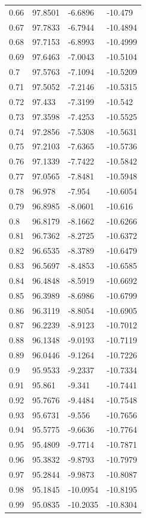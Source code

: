 \begin{tabular}{llll}
0.66 & 97.8501 & -6.6896 & -10.479 \\
0.67 & 97.7833 & -6.7944 & -10.4894 \\
0.68 & 97.7153 & -6.8993 & -10.4999 \\
0.69 & 97.6463 & -7.0043 & -10.5104 \\
0.7 & 97.5763 & -7.1094 & -10.5209 \\
0.71 & 97.5052 & -7.2146 & -10.5315 \\
0.72 & 97.433 & -7.3199 & -10.542 \\
0.73 & 97.3598 & -7.4253 & -10.5525 \\
0.74 & 97.2856 & -7.5308 & -10.5631 \\
0.75 & 97.2103 & -7.6365 & -10.5736 \\
0.76 & 97.1339 & -7.7422 & -10.5842 \\
0.77 & 97.0565 & -7.8481 & -10.5948 \\
0.78 & 96.978 & -7.954 & -10.6054 \\
0.79 & 96.8985 & -8.0601 & -10.616 \\
0.8 & 96.8179 & -8.1662 & -10.6266 \\
0.81 & 96.7362 & -8.2725 & -10.6372 \\
0.82 & 96.6535 & -8.3789 & -10.6479 \\
0.83 & 96.5697 & -8.4853 & -10.6585 \\
0.84 & 96.4848 & -8.5919 & -10.6692 \\
0.85 & 96.3989 & -8.6986 & -10.6799 \\
0.86 & 96.3119 & -8.8054 & -10.6905 \\
0.87 & 96.2239 & -8.9123 & -10.7012 \\
0.88 & 96.1348 & -9.0193 & -10.7119 \\
0.89 & 96.0446 & -9.1264 & -10.7226 \\
0.9 & 95.9533 & -9.2337 & -10.7334 \\
0.91 & 95.861 & -9.341 & -10.7441 \\
0.92 & 95.7676 & -9.4484 & -10.7548 \\
0.93 & 95.6731 & -9.556 & -10.7656 \\
0.94 & 95.5775 & -9.6636 & -10.7764 \\
0.95 & 95.4809 & -9.7714 & -10.7871 \\
0.96 & 95.3832 & -9.8793 & -10.7979 \\
0.97 & 95.2844 & -9.9873 & -10.8087 \\
0.98 & 95.1845 & -10.0954 & -10.8195 \\
0.99 & 95.0835 & -10.2035 & -10.8304 \\

\end{tabular}
